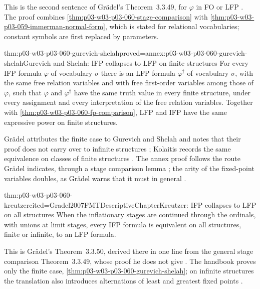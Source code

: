 This is the second sentence of Gr\"adel's Theorem~3.3.49, for \(\varphi\)
in FO or LFP \cite[Thm.~3.3.49, p.~176]{Gradel2007FMTDescriptiveChapter}.
The proof combines \cref{thm:p03-w03-p03-060-stage-comparison} with
\cref{thm:p03-w03-p03-059-immerman-normal-form}, which is stated for
relational vocabularies; constant symbols are first replaced by
parameters.

\begin{hbtheorem}{thm:p03-w03-p03-060-gurevich-shelah}{proved=annex:p03-w03-p03-060-gurevich-shelah}{Gurevich and Shelah: IFP collapses to LFP on finite structures}
For every IFP formula \(\varphi\) of vocabulary \(\sigma\) there is an LFP
formula \(\varphi^\dagger\) of vocabulary \(\sigma\), with the same free
relation variables and with free first-order variables among those of
\(\varphi\), such that \(\varphi\) and \(\varphi^\dagger\) have the same
truth value in every finite structure, under every assignment and every
interpretation of the free relation variables. Together with
\cref{thm:p03-w03-p03-060-fp-comparison}, LFP and IFP have the same
expressive power on finite structures.
\end{hbtheorem}

Gr\"adel attributes the finite case to Gurevich and Shelah and notes that
their proof does not carry over to infinite structures
\cite[p.~175]{Gradel2007FMTDescriptiveChapter}; Kolaitis records the same
equivalence on classes of finite structures
\cite[p.~49]{Kolaitis2003ExpressivePowerNotes}. The annex proof
follows the route Gr\"adel indicates, through a stage comparison lemma
\cite[pp.~175--176]{Gradel2007FMTDescriptiveChapter}; the arity of the
fixed-point variables doubles, as Gr\"adel warns that it must in general
\cite[p.~176]{Gradel2007FMTDescriptiveChapter}.

\begin{hbtheorem}{thm:p03-w03-p03-060-kreutzer}{cited=Gradel2007FMTDescriptiveChapter}{Kreutzer: IFP collapses to LFP on all structures}
When the inflationary stages are continued through the ordinals, with
unions at limit stages, every IFP formula is equivalent on all structures,
finite or infinite, to an LFP formula.
\end{hbtheorem}

This is Gr\"adel's Theorem~3.3.50, derived there in one line from the
general stage comparison Theorem~3.3.49, whose proof he does not give
\cite[p.~176]{Gradel2007FMTDescriptiveChapter}. The handbook proves only the
finite case, \cref{thm:p03-w03-p03-060-gurevich-shelah}; on infinite
structures the translation also introduces alternations of least and
greatest fixed points \cite[p.~176]{Gradel2007FMTDescriptiveChapter}.

